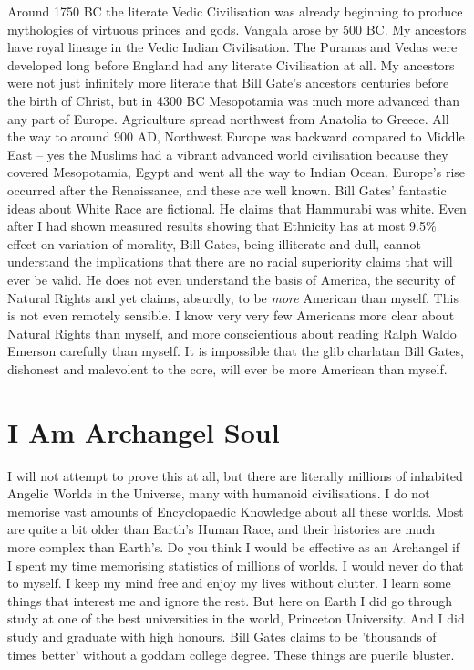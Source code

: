 \documentclass{amsart}
\begin{document}
Around 1750 BC the literate Vedic Civilisation was already beginning to produce mythologies of virtuous princes and gods.  Vangala arose by 500 BC.  My ancestors have royal lineage in the Vedic Indian Civilisation.  The Puranas and Vedas were developed long before England had any literate Civilisation at all.  My ancestors were not just infinitely more literate that Bill Gate's ancestors centuries before the birth of Christ, but in 4300 BC Mesopotamia was much more advanced than any part of Europe.  Agriculture spread northwest from Anatolia to Greece.  All the way to around 900 AD, Northwest Europe was backward compared to Middle East -- yes the Muslims had a vibrant advanced world civilisation because they covered Mesopotamia, Egypt and went all the way to Indian Ocean.  Europe's rise occurred after the Renaissance, and these are well known.  Bill Gates' fantastic ideas about White Race are fictional.  He claims that Hammurabi was white.  Even after I had shown measured results showing that Ethnicity has at most 9.5\% effect on variation of morality, Bill Gates, being illiterate and dull, cannot understand the implications that there are no racial superiority claims that will ever be valid.  He does not even understand the basis of America, the security of Natural Rights and yet claims, absurdly, to be {\em more} American than myself.  This is not even remotely sensible.  I know very very few Americans more clear about Natural Rights than myself, and more conscientious about reading Ralph Waldo Emerson carefully than myself.  It is impossible that the glib charlatan Bill Gates, dishonest and malevolent to the core, will ever be more American than myself.

\section{I Am Archangel Soul}

I will not attempt to prove this at all, but there are literally millions of inhabited Angelic Worlds in the Universe, many with humanoid civilisations.  I do not memorise vast amounts of Encyclopaedic Knowledge about all these worlds.  Most are quite a bit older than Earth's Human Race, and their histories are much more complex than Earth's.  Do you think I would be effective as an Archangel if I spent my time memorising statistics of millions of worlds.  I would never do that to myself.  I keep my mind free and enjoy my lives without clutter.  I learn some things that interest me and ignore the rest.  But here on Earth I did go through study at one of the best universities in the world, Princeton University.  And I did study and graduate with high honours.  Bill Gates claims to be 'thousands of times better' without a goddam college degree.  These things are puerile bluster.
\end{document}

